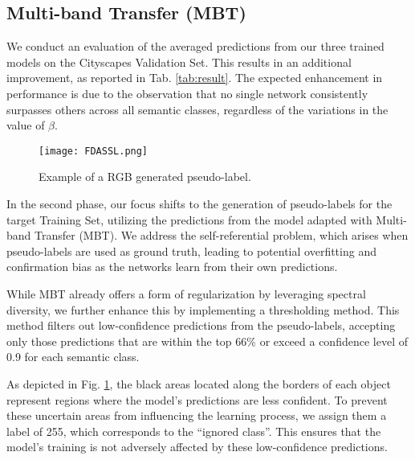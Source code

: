 \documentclass[10pt,twocolumn,letterpaper]{article}
\begin{document}
\subsection{Multi-band Transfer (MBT)}

We conduct an evaluation of the averaged predictions from our three trained models on the Cityscapes Validation Set. This results in an additional improvement, as reported in Tab. \ref{tab:result}. The expected enhancement in performance is due to the observation that no single network consistently surpasses others across all semantic classes, regardless of the variations in the value of $\beta$.\\

\begin{figure}[h]
    \centering
    \texttt{[image: FDASSL.png]}
    \caption{Example of a RGB generated pseudo-label.}
    \label{fig:pseudolabel}
\end{figure}

In the second phase, our focus shifts to the generation of pseudo-labels for the target Training Set, utilizing the predictions from the model adapted with Multi-band Transfer (MBT). We address the self-referential problem, which arises when pseudo-labels are used as ground truth, leading to potential overfitting and confirmation bias as the networks learn from their own predictions.

While MBT already offers a form of regularization by leveraging spectral diversity, we further enhance this by implementing a thresholding method. This method filters out low-confidence predictions from the pseudo-labels, accepting only those predictions that are within the top 66\% or exceed a confidence level of 0.9 for each semantic class.

As depicted in Fig. \ref{fig:pseudolabel}, the black areas located along the borders of each object represent regions where the model’s predictions are less confident. To prevent these uncertain areas from influencing the learning process, we assign them a label of 255, which corresponds to the “ignored class”. This ensures that the model’s training is not adversely affected by these low-confidence predictions.
\end{document}
